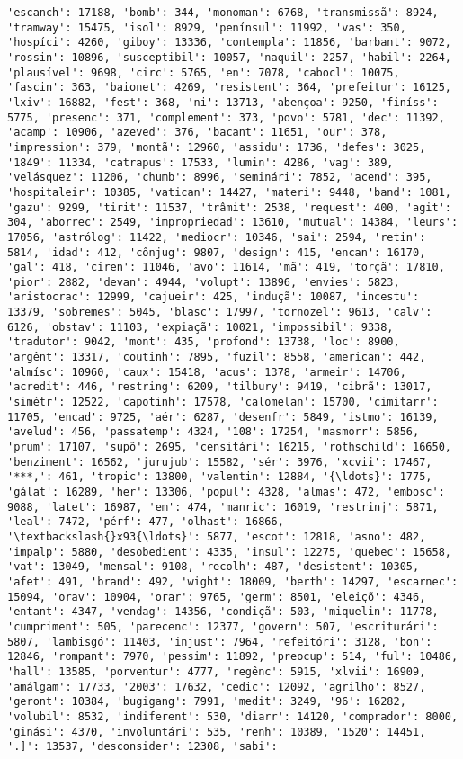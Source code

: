\documentclass[11pt]{article}
\begin{document}
\begin{Verbatim}[commandchars=\\\{\}]
'escanch': 17188, 'bomb': 344, 'monoman': 6768, 'transmissã': 8924, 'tramway': 15475, 'isol': 8929, 'penínsul': 11992, 'vas': 350, 'hospíci': 4260, 'giboy': 13336, 'contempla': 11856, 'barbant': 9072, 'rossin': 10896, 'susceptibil': 10057, 'naquil': 2257, 'habil': 2264, 'plausível': 9698, 'circ': 5765, 'en': 7078, 'cabocl': 10075, 'fascin': 363, 'baionet': 4269, 'resistent': 364, 'prefeitur': 16125, 'lxiv': 16882, 'fest': 368, 'ni': 13713, 'abençoa': 9250, 'finíss': 5775, 'presenc': 371, 'complement': 373, 'povo': 5781, 'dec': 11392, 'acamp': 10906, 'azeved': 376, 'bacant': 11651, 'our': 378, 'impression': 379, 'montã': 12960, 'assidu': 1736, 'defes': 3025, '1849': 11334, 'catrapus': 17533, 'lumin': 4286, 'vag': 389, 'velásquez': 11206, 'chumb': 8996, 'seminári': 7852, 'acend': 395, 'hospitaleir': 10385, 'vatican': 14427, 'materi': 9448, 'band': 1081, 'gazu': 9299, 'tirit': 11537, 'trâmit': 2538, 'request': 400, 'agit': 304, 'aborrec': 2549, 'impropriedad': 13610, 'mutual': 14384, 'leurs': 17056, 'astrólog': 11422, 'mediocr': 10346, 'sai': 2594, 'retin': 5814, 'idad': 412, 'cônjug': 9807, 'design': 415, 'encan': 16170, 'gal': 418, 'ciren': 11046, 'avo': 11614, 'mã': 419, 'torçã': 17810, 'pior': 2882, 'devan': 4944, 'volupt': 13896, 'envies': 5823, 'aristocrac': 12999, 'cajueir': 425, 'induçã': 10087, 'incestu': 13379, 'sobremes': 5045, 'blasc': 17997, 'tornozel': 9613, 'calv': 6126, 'obstav': 11103, 'expiaçã': 10021, 'impossibil': 9338, 'tradutor': 9042, 'mont': 435, 'profond': 13738, 'loc': 8900, 'argênt': 13317, 'coutinh': 7895, 'fuzil': 8558, 'american': 442, 'almísc': 10960, 'caux': 15418, 'acus': 1378, 'armeir': 14706, 'acredit': 446, 'restring': 6209, 'tilbury': 9419, 'cibrã': 13017, 'simétr': 12522, 'capotinh': 17578, 'calomelan': 15700, 'cimitarr': 11705, 'encad': 9725, 'aér': 6287, 'desenfr': 5849, 'istmo': 16139, 'avelud': 456, 'passatemp': 4324, '108': 17254, 'masmorr': 5856, 'prum': 17107, 'supõ': 2695, 'censitári': 16215, 'rothschild': 16650, 'benziment': 16562, 'jurujub': 15582, 'sér': 3976, 'xcvii': 17467, '***,': 461, 'tropic': 13800, 'valentin': 12884, '{\ldots}': 1775, 'gálat': 16289, 'her': 13306, 'popul': 4328, 'almas': 472, 'embosc': 9088, 'latet': 16987, 'em': 474, 'manric': 16019, 'restrinj': 5871, 'leal': 7472, 'pérf': 477, 'olhast': 16866, '\textbackslash{}x93{\ldots}': 5877, 'escot': 12818, 'asno': 482, 'impalp': 5880, 'desobedient': 4335, 'insul': 12275, 'quebec': 15658, 'vat': 13049, 'mensal': 9108, 'recolh': 487, 'desistent': 10305, 'afet': 491, 'brand': 492, 'wight': 18009, 'berth': 14297, 'escarnec': 15094, 'orav': 10904, 'orar': 9765, 'germ': 8501, 'eleiçõ': 4346, 'entant': 4347, 'vendag': 14356, 'condiçã': 503, 'miquelin': 11778, 'cumpriment': 505, 'parecenc': 12377, 'govern': 507, 'escriturári': 5807, 'lambisgó': 11403, 'injust': 7964, 'refeitóri': 3128, 'bon': 12846, 'rompant': 7970, 'pessim': 11892, 'preocup': 514, 'ful': 10486, 'hall': 13585, 'porventur': 4777, 'regênc': 5915, 'xlvii': 16909, 'amálgam': 17733, '2003': 17632, 'cedic': 12092, 'agrilho': 8527, 'geront': 10384, 'bugigang': 7991, 'medit': 3249, '96': 16282, 'volubil': 8532, 'indiferent': 530, 'diarr': 14120, 'comprador': 8000, 'ginási': 4370, 'involuntári': 535, 'renh': 10389, '1520': 14451, '.]': 13537, 'desconsider': 12308, 'sabi': 
\end{Verbatim}
\end{document}

